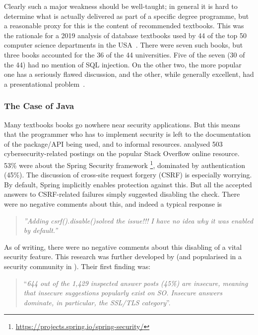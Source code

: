 \documentclass[sigconf]{acmart}
\begin{document}

Clearly such a major weakness should be well-taught; in general it is hard to determine what is actually delivered as part of a specific degree programme, but a reasonable proxy for this is the content of recommended textbooks. This was the rationale for a 2019 analysis of database textbooks used by 44 of the top 50 computer science departments in the USA~\cite{Drop2019}.  There were seven such books, but three books accounted for the 36 of the 44 universities. Five of the seven (30 of the 44) had no mention of SQL injection. On the other two, the more popular one has a seriously flawed discussion, and the other, while generally excellent, had a presentational problem~\cite{Drop2019}.

\subsubsection{The Case of Java}
Many textbooks books go nowhere near security applications.  But this means that the programmer who has to implement security is left to the documentation of the package/API being used, and to informal resources. \cite{Mengetal2018a} analysed 503 cybersecurity-related postings on the popular Stack Overflow online resource.  53\% were about the Spring Security framework  \footnote{\url{https://projects.spring.io/spring-security/}}, dominated by authentication (45\%). The discussion \cite[\S4.3.1]{Mengetal2018a} of cross-site request forgery (CSRF) is especially worrying.  By default, Spring implicitly enables protection against this. But all the accepted answers to CSRF-related failures simply suggested disabling the check. There were no negative comments about this, and indeed a typical response is 
\begin{quote}
	\textit{''Adding csrf().disable()solved the issue!!! I have no idea why it was enabled by default.''}
\end{quote}
As of writing, there were no negative comments about this disabling of a vital security feature. This research was further developed by \cite{Chenetal2019a}  (and popularised in a security community in \cite{Zorz2019a}). Their first finding was:

\begin{quote}
	``{\emph{644 out of the 1,429 inspected answer posts
			(45\%) are insecure, meaning that insecure suggestions
			popularly exist on SO. Insecure answers dominate, in
			particular, the SSL/TLS category}}''.
\end{quote} 
\end{document}
